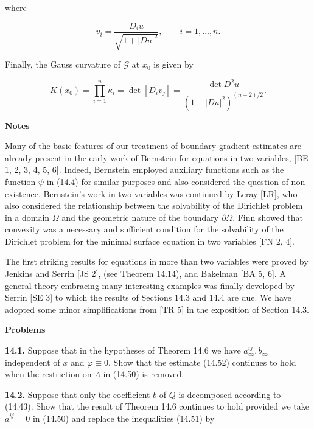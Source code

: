 \noindent where

\[
v_i=\frac{D_i u}{\sqrt{1+|Du|^2}}, \qquad i=1,\ldots,n.
\]

\noindent Finally, the Gauss curvature of $\mathcal{G}$ at $x_0$ is given by

\begin{equation}
\tag{14.105}
K(x_0)=\prod_{i=1}^n \kappa_i
=\det [D_i v_j]
=\frac{\det D^2u}{(1+|Du|^2)^{(n+2)/2}}.
\end{equation}

\bigskip

\noindent\textbf{Notes}

\medskip

Many of the basic features of our treatment of boundary gradient estimates are
already present in the early work of Bernstein for equations in two variables, [BE
1, 2, 3, 4, 5, 6]. Indeed, Bernstein employed auxiliary functions such as the function
$\psi$ in (14.4) for similar purposes and also considered the question of non-existence.
Bernstein's work in two variables was continued by Leray [LR], who also
considered the relationship between the solvability of the Dirichlet problem in a
domain $\Omega$ and the geometric nature of the boundary $\partial\Omega$. Finn showed that
convexity was a necessary and sufficient condition for the solvability of the
Dirichlet problem for the minimal surface equation in two variables [FN 2, 4].

The first striking results for equations in more than two variables were proved
by Jenkins and Serrin [JS 2], (see Theorem 14.14), and Bakelman [BA 5, 6]. A
general theory embracing many interesting examples was finally developed by
Serrin [SE 3] to which the results of Sections 14.3 and 14.4 are due. We have
adopted some minor simplifications from [TR 5] in the exposition of Section 14.3.



\noindent\textbf{Problems}

\medskip

\noindent\textbf{14.1.} Suppose that in the hypotheses of Theorem 14.6 we have $a_{\infty}^{ij}, b_{\infty}$ independent of $x$ and $\varphi \equiv 0$. Show that the estimate (14.52) continues to hold when the restriction on $\Lambda$ in (14.50) is removed.

\medskip

\noindent\textbf{14.2.} Suppose that only the coefficient $b$ of $Q$ is decomposed according to (14.43). Show that the result of Theorem 14.6 continues to hold provided we take $a_{0}^{ij}=0$ in (14.50) and replace the inequalities (14.51) by

